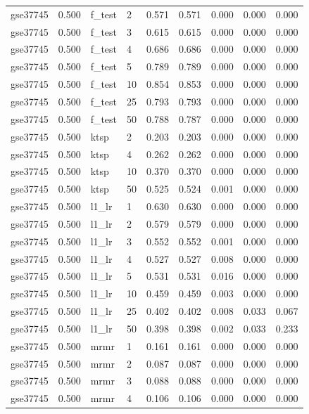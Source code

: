\begin{table}[t]
\begin{tabular}{lllllllll}
    gse37745 & 0.500 & f\_test & 2 & 0.571 & 0.571 & 0.000 & 0.000 & 0.000 \\
    gse37745 & 0.500 & f\_test & 3 & 0.615 & 0.615 & 0.000 & 0.000 & 0.000 \\
    gse37745 & 0.500 & f\_test & 4 & 0.686 & 0.686 & 0.000 & 0.000 & 0.000 \\
    gse37745 & 0.500 & f\_test & 5 & 0.789 & 0.789 & 0.000 & 0.000 & 0.000 \\
    gse37745 & 0.500 & f\_test & 10 & 0.854 & 0.853 & 0.000 & 0.000 & 0.000 \\
    gse37745 & 0.500 & f\_test & 25 & 0.793 & 0.793 & 0.000 & 0.000 & 0.000 \\
    gse37745 & 0.500 & f\_test & 50 & 0.788 & 0.787 & 0.000 & 0.000 & 0.000 \\
    gse37745 & 0.500 & ktsp & 2 & 0.203 & 0.203 & 0.000 & 0.000 & 0.000 \\
    gse37745 & 0.500 & ktsp & 4 & 0.262 & 0.262 & 0.000 & 0.000 & 0.000 \\
    gse37745 & 0.500 & ktsp & 10 & 0.370 & 0.370 & 0.000 & 0.000 & 0.000 \\
    gse37745 & 0.500 & ktsp & 50 & 0.525 & 0.524 & 0.001 & 0.000 & 0.000 \\
    gse37745 & 0.500 & l1\_lr & 1 & 0.630 & 0.630 & 0.000 & 0.000 & 0.000 \\
    gse37745 & 0.500 & l1\_lr & 2 & 0.579 & 0.579 & 0.000 & 0.000 & 0.000 \\
    gse37745 & 0.500 & l1\_lr & 3 & 0.552 & 0.552 & 0.001 & 0.000 & 0.000 \\
    gse37745 & 0.500 & l1\_lr & 4 & 0.527 & 0.527 & 0.008 & 0.000 & 0.000 \\
    gse37745 & 0.500 & l1\_lr & 5 & 0.531 & 0.531 & 0.016 & 0.000 & 0.000 \\
    gse37745 & 0.500 & l1\_lr & 10 & 0.459 & 0.459 & 0.003 & 0.000 & 0.000 \\
    gse37745 & 0.500 & l1\_lr & 25 & 0.402 & 0.402 & 0.008 & 0.033 & 0.067 \\
    gse37745 & 0.500 & l1\_lr & 50 & 0.398 & 0.398 & 0.002 & 0.033 & 0.233 \\
    gse37745 & 0.500 & mrmr & 1 & 0.161 & 0.161 & 0.000 & 0.000 & 0.000 \\
    gse37745 & 0.500 & mrmr & 2 & 0.087 & 0.087 & 0.000 & 0.000 & 0.000 \\
    gse37745 & 0.500 & mrmr & 3 & 0.088 & 0.088 & 0.000 & 0.000 & 0.000 \\
    gse37745 & 0.500 & mrmr & 4 & 0.106 & 0.106 & 0.000 & 0.000 & 0.000 \\

\end{tabular}
\end{table}

